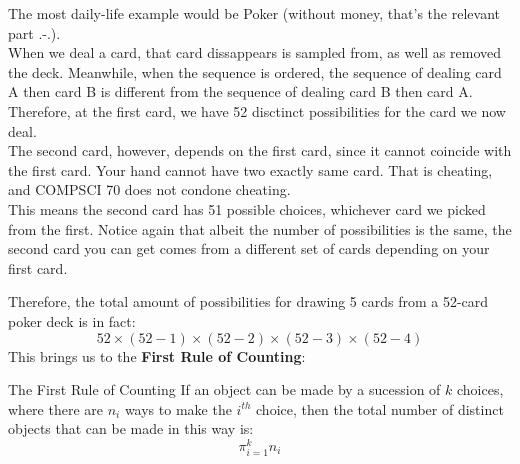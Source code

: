 The most daily-life example would be Poker (without money, that's the relevant part .-.). \\
When we deal a card, that card dissappears is sampled from, as well as removed the deck. Meanwhile, when the sequence is ordered, the sequence of dealing card A then card B is different from the sequence of dealing card B then card A. \\
Therefore, at the first card, we have 52 disctinct possibilities for the card we now deal. \\
The second card, however, depends on the first card, since it cannot coincide with the first card. Your hand cannot have two exactly same card. That is cheating, and COMPSCI 70 does not condone cheating. \\
This means the second card has 51 possible choices, whichever card we picked from the first. Notice again that albeit the number of possibilities is the same, the second card you can get comes from a different set of cards depending on your first card.

Therefore, the total amount of possibilities for drawing 5 cards from a 52-card poker deck is in fact:
\[52 \times (52 - 1) \times (52 - 2) \times (52 - 3) \times (52 - 4)\]
This brings us to the \textbf{First Rule of Counting}:
\begin{ln-axiom}{The First Rule of Counting}{}
    If an object can be made by a sucession of $k$ choices, where there are $n_i$ ways to make the $i^{th}$ choice, then the total number of distinct objects that can be made in this way is:
    \[\pi_{i = 1}^k n_i\]
\end{ln-axiom}

